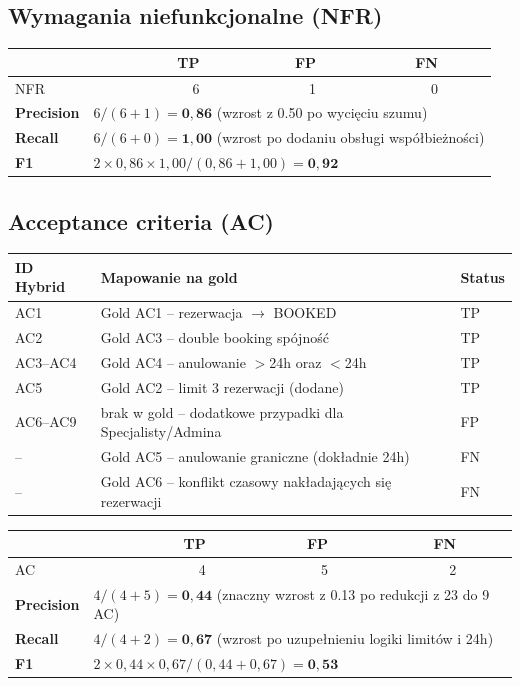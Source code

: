 \documentclass[12pt,a4paper]{article}
\newcommand{\tp}[1]{\colorbox{tpcolor}{\small #1}}
\newcommand{\fp}[1]{\colorbox{fpcolor}{\small #1}}
\newcommand{\fn}[1]{\colorbox{fncolor}{\small #1}}
\begin{document}
\vspace{1em}
\subsection{Wymagania niefunkcjonalne (NFR)}

\begin{tabular}{lrrrr}
\toprule
& \textbf{TP} & \textbf{FP} & \textbf{FN} & \\
\midrule
NFR & 6 & 1 & 0 & \\
\midrule
\textbf{Precision} & \multicolumn{4}{l}{$6 / (6+1) = \mathbf{0{,}86}$ (wzrost z 0.50 po wycięciu szumu)} \\
\textbf{Recall}    & \multicolumn{4}{l}{$6 / (6+0) = \mathbf{1{,}00}$ (wzrost po dodaniu obsługi współbieżności)} \\
\textbf{F1}        & \multicolumn{4}{l}{$2 \times 0{,}86 \times 1{,}00 / (0{,}86+1{,}00) = \mathbf{0{,}92}$} \\
\bottomrule
\end{tabular}

\vspace{1em}
\subsection{Acceptance criteria (AC)}

\begin{tabular}{p{2.5cm} p{7cm} l}
\toprule
\textbf{ID Hybrid} & \textbf{Mapowanie na gold} & \textbf{Status} \\
\midrule
AC1 & Gold AC1 -- rezerwacja $\rightarrow$ BOOKED & \tp{TP} \\
AC2 & Gold AC3 -- double booking spójność & \tp{TP} \\
AC3--AC4 & Gold AC4 -- anulowanie $>$24h oraz $<$24h & \tp{TP} \\
AC5 & Gold AC2 -- limit 3 rezerwacji (dodane) & \tp{TP} \\
AC6--AC9 & brak w gold -- dodatkowe przypadki dla Specjalisty/Admina & \fp{FP} \\
\midrule
-- & Gold AC5 -- anulowanie graniczne (dokładnie 24h) & \fn{FN} \\
-- & Gold AC6 -- konflikt czasowy nakładających się rezerwacji & \fn{FN} \\
\bottomrule
\end{tabular}

\vspace{0.5em}
\begin{tabular}{lrrrr}
\toprule
& \textbf{TP} & \textbf{FP} & \textbf{FN} & \\
\midrule
AC & 4 & 5 & 2 & \\
\midrule
\textbf{Precision} & \multicolumn{4}{l}{$4 / (4+5) = \mathbf{0{,}44}$ (znaczny wzrost z 0.13 po redukcji z 23 do 9 AC)} \\
\textbf{Recall}    & \multicolumn{4}{l}{$4 / (4+2) = \mathbf{0{,}67}$ (wzrost po uzupełnieniu logiki limitów i 24h)} \\
\textbf{F1}        & \multicolumn{4}{l}{$2 \times 0{,}44 \times 0{,}67 / (0{,}44+0{,}67) = \mathbf{0{,}53}$} \\
\bottomrule
\end{tabular}
\end{document}
